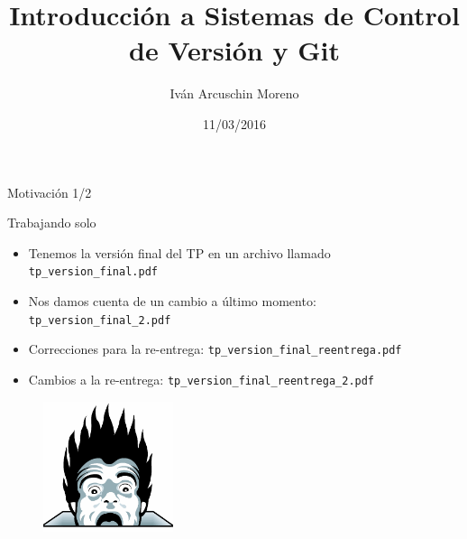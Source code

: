\documentclass{beamer}
\title[SCV y Git]{Introducción a Sistemas de Control de Versión y Git}
\author[Iván Arcuschin]{Iván Arcuschin Moreno}
\institute{DC - FCEyN - UBA}
\date{11/03/2016}
\begin{document}
\begin{frame}
  \titlepage
\end{frame}

\begin{frame}{Motivación 1/2}

    \begin{block}{Trabajando solo}
        \begin{itemize}
            \item Tenemos la versión final del TP en un archivo llamado \texttt{tp\_version\_final.pdf}
            \pause
            \item Nos damos cuenta de un cambio a último momento: \texttt{tp\_version\_final\_2.pdf}
            \pause
            \item Correcciones para la re-entrega: \texttt{tp\_version\_final\_reentrega.pdf}
            \pause
            \item Cambios a la re-entrega: \texttt{tp\_version\_final\_reentrega\_2.pdf}
        \end{itemize}
    \end{block}

    \pause
    \begin{figure}[ht]
        \begin{center}
            \includegraphics[height=1.5in]{images/horror.png}
        \end{center}
    \end{figure}

\end{frame}
\end{document}
